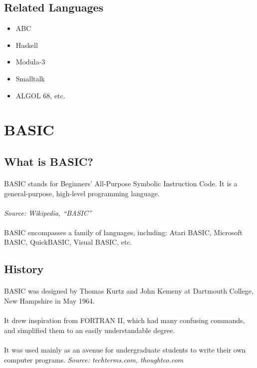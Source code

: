 \documentclass{article}
\begin{document}
	\subsection{Related Languages}
	\begin{itemize}
		\item ABC
		\item Haskell
		\item Modula-3
		\item Smalltalk
		\item ALGOL 68, etc.
	\end{itemize}


	\section{BASIC}
	\subsection{What is BASIC?}
	\paragraph{}BASIC stands for Beginners’ All-Purpose Symbolic Instruction Code.
	It is a general-purpose, high-level programming language.
	\paragraph{}\textit{Source: Wikipedia, “BASIC”}
	\paragraph{}BASIC encompasses a family of languages, including: Atari BASIC, Microsoft BASIC, QuickBASIC, Visual BASIC, etc.
	\subsection{History}
	\paragraph{}BASIC was designed by Thomas Kurtz and John Kemeny at Dartmouth College, New Hampshire in May 1964.
	\paragraph{}It drew inspiration from FORTRAN II, which had many confusing commands, and simplified them to an easily understandable degree.
	\paragraph{}It was used mainly as an avenue for undergraduate students to write their own computer programs.
	\textit{Source: techterms.com, thoughtco.com}
\end{document}
